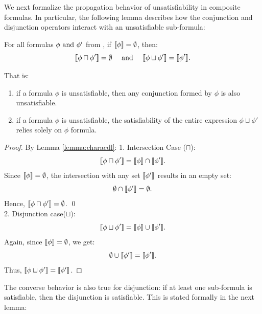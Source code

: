 We next formalize the propagation behavior of unsatisfiability in composite formulas. In particular, the following lemma describes how the conjunction and disjunction operators interact with an unsatisfiable sub-formula:
\begin{lemma}  
\label{empty_inter_union}  
For all formulas $\phi \text{ and } \phi'$ from \TDDLfm, if $\llbracket \phi \rrbracket = \emptyset$, then:  
\[
\llbracket \phi \sqcap \phi' \rrbracket = \emptyset \quad \text{ and } \quad \llbracket \phi \sqcup \phi' \rrbracket = \llbracket \phi' \rrbracket.
\]  

That is:\begin{enumerate}
\item if a formula $\phi$ is unsatisfiable, then any conjunction formed by $\phi$ is also unsatisfiable.

\item  if a formula $\phi$ is unsatisfiable, the satisfiability of the entire expression $\phi \sqcup \phi'$ relies solely on $\phi$ formula.
\end{enumerate}
\end{lemma} 


\begin{proof}
By Lemma \ref{lemma:characdl}:
1. Intersection Case (\(\sqcap\)):  
   \[
   \llbracket \phi \sqcap \phi' \rrbracket = \llbracket \phi \rrbracket \cap \llbracket \phi' \rrbracket.
   \]  
   Since \(\llbracket \phi \rrbracket = \emptyset\), the intersection with any set \(\llbracket \phi' \rrbracket\) results in an empty set:  
   \[
   \emptyset \cap \llbracket \phi' \rrbracket = \emptyset.
   \]  
   Hence, \(\llbracket \phi \sqcap \phi' \rrbracket = \emptyset\).  
\qed
\\
2. Disjunction case(\(\sqcup\)):  
   \[
   \llbracket \phi \sqcup \phi' \rrbracket = \llbracket \phi \rrbracket \cup \llbracket \phi' \rrbracket.
   \]  
   Again, since \(\llbracket \phi \rrbracket = \emptyset\), we get:  
   \[
   \emptyset \cup \llbracket \phi' \rrbracket = \llbracket \phi' \rrbracket.
   \]  
   Thus, \(\llbracket \phi \sqcup \phi' \rrbracket = \llbracket \phi' \rrbracket\).  
\end{proof}




The converse behavior is also true for disjunction: if at least one sub-formula is satisfiable, then the disjunction is satisfiable. This is stated formally in the next lemma:

